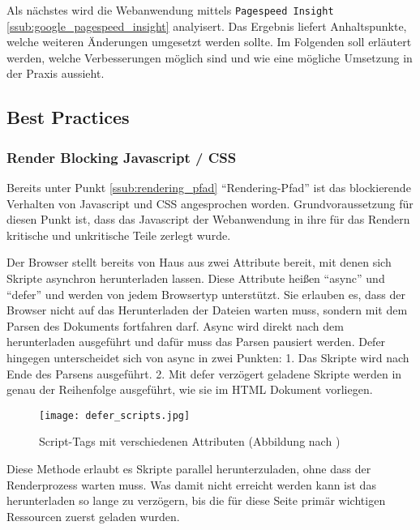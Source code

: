 		Als nächstes wird die Webanwendung mittels \texttt{Pagespeed Insight} \ref{ssub:google_pagespeed_insight} analyisert. Das Ergebnis liefert Anhaltspunkte, welche weiteren Änderungen umgesetzt werden sollte. Im Folgenden soll erläutert werden, welche Verbesserungen möglich sind und wie eine mögliche Umsetzung in der Praxis aussieht.

		\pagebreak
		
		\subsection{Best Practices}
		\label{sub:best_practices}
		
			\subsubsection{Render Blocking Javascript / CSS} %
			\label{ssub:render_blocking_javascript}
				Bereits unter Punkt \ref{ssub:rendering_pfad} "`Rendering-Pfad"' ist das blockierende Verhalten von Javascript und CSS angesprochen worden. Grundvoraussetzung für diesen Punkt ist, dass das Javascript der Webanwendung in ihre für das Rendern kritische und unkritische Teile zerlegt wurde.

				Der Browser stellt bereits von Haus aus zwei Attribute bereit, mit denen sich Skripte asynchron herunterladen lassen. Diese Attribute heißen "`async"' und "`defer"' und werden von jedem Browsertyp unterstützt.\autocite{canIuse} Sie erlauben es, dass der Browser nicht auf das Herunterladen der Dateien warten muss, sondern mit dem Parsen des Dokuments fortfahren darf. Async wird direkt nach dem herunterladen ausgeführt und dafür muss das Parsen pausiert werden. Defer hingegen unterscheidet sich von async in zwei Punkten: 1. Das Skripte wird nach Ende des Parsens ausgeführt. 2. Mit defer verzögert geladene Skripte werden in genau der Reihenfolge ausgeführt, wie sie im HTML Dokument vorliegen.
				
				\begin{figure}[htbp]
					\begin{center}
						\texttt{[image: defer\_scripts.jpg]}
						\caption{Script-Tags mit verschiedenen Attributen (Abbildung nach \autocite{growing})}
						\label{fig:defer_scripts}
					\end{center}
				\end{figure}

				Diese Methode erlaubt es Skripte parallel herunterzuladen, ohne dass der Renderprozess warten muss. Was damit nicht erreicht werden kann ist das herunterladen so lange zu verzögern, bis die für diese Seite primär wichtigen Ressourcen zuerst geladen wurden.

